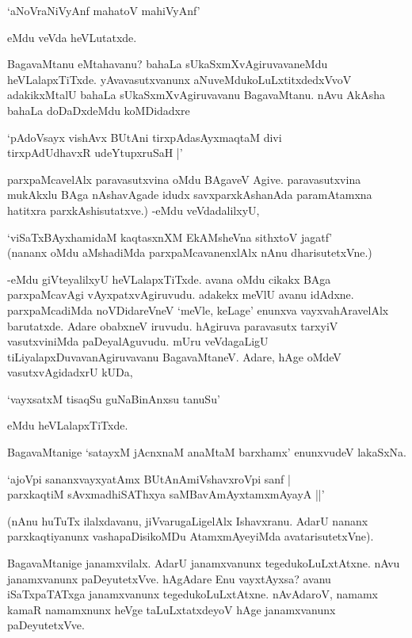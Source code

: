 \begin{shloka}
`aNoVraNiVyAnf mahatoV mahiVyAnf'
\end{shloka}

eMdu veVda heVLutatxde.

BagavaMtanu eMtahavanu? bahaLa sUkaSxmXvAgiruvavaneMdu heVLalapxTiTxde. yAvavasutxvanunx aNuveMdukoLuLxtitxdedxVvoV adakikxMtalU bahaLa sUkaSxmXvAgiruvavanu BagavaMtanu. nAvu AkAsha bahaLa doDaDxdeMdu koMDidadxre 

\begin{shloka}
`pAdoV\s sayx vishAvx BUtAni tirxpAdasAyxmaqtaM divi\\
tirxpAdUdhavxR udeYtupxruSaH‌ |'
\end{shloka}

parxpaMcavelAlx paravasutxvina oMdu BAgaveV Agive. paravasutxvina mukAkxlu BAga nAshavAgade idudx savxparxkAshanAda paramAtamxna hatitxra parxkAshisutatxve.) -eMdu veVdadalilxyU,

\begin{shloka}
`viSaTxBAyxhamidaM kaqtasxnXM EkAMsheVna sithxtoV jagatf'\\
(nananx oMdu aMshadiMda parxpaMcavanenxlAlx nAnu dharisutetxVne.)
\end{shloka}

-eMdu giVteyalilxyU heVLalapxTiTxde. avana oMdu cikakx BAga parxpaMcavAgi vAyxpatxvAgiruvudu. adakekx meVlU avanu idAdxne. parxpaMcadiMda noVDidareVneV `meVle, keLage' enunxva vayxvahAravelAlx barutatxde. Adare obabxneV iruvudu. hAgiruva paravasutx tarxyiV vasutxviniMda paDeyalAguvudu. mUru veVdagaLigU tiLiyalapxDuvavanAgiruvavanu BagavaMtaneV. Adare, hAge oMdeV vasutxvAgidadxrU kUDa,

\begin{shloka}
`vayxsatxM tisaqSu guNaBinAnxsu tanuSu'
\end{shloka}

eMdu heVLalapxTiTxde.

BagavaMtanige `satayxM jAcnxnaM anaMtaM barxhamx' enunxvudeV lakaSxNa.

\begin{shloka}
`ajoV\s pi sananxvayxyatAmx BUtAnAmiVshavxroV\s pi sanf |\\
parxkaqtiM sAvxmadhiSAThxya saMBavAmAyxtamxmAyayA ||'
\end{shloka}

(nAnu huTuTx ilalxdavanu, jiVvarugaLigelAlx Ishavxranu. AdarU nananx parxkaqtiyanunx vashapaDisikoMDu AtamxmAyeyiMda avatarisutetxVne).


BagavaMtanige janamxvilalx. AdarU janamxvanunx tegedukoLuLxtAtxne. nAvu janamxvanunx paDeyutetxVve. hAgAdare Enu vayxtAyxsa? avanu iSaTxpaTATxga janamxvanunx tegedukoLuLxtAtxne. nAvAdaroV, namamx kamaR namamxnunx heVge taLuLxtatxdeyoV hAge janamxvanunx paDeyutetxVve.

